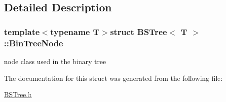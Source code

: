 \subsection{Detailed Description}
\subsubsection*{template$<$typename T$>$struct B\-S\-Tree$<$ T $>$\-::\-Bin\-Tree\-Node}

node class used in the binary tree 

The documentation for this struct was generated from the following file\-:\begin{DoxyCompactItemize}
\item 
\hyperlink{BSTree_8h}{B\-S\-Tree.\-h}\end{DoxyCompactItemize}
